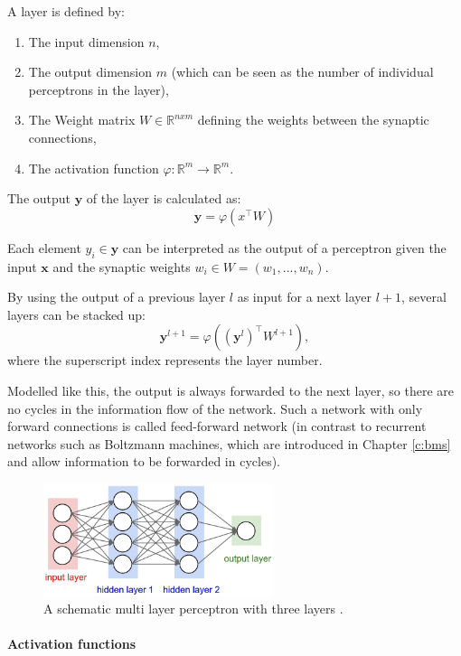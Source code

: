 A layer is defined by:
\begin{enumerate}
	\item The input dimension $n$,
	\item The output dimension $m$ (which can be seen as the number of individual perceptrons in the layer),
	\item The Weight matrix $W \in \mathbb{R}^{nxm} $ defining the weights between the synaptic connections,
	\item The activation function $\varphi : \mathbb{R}^m \rightarrow \mathbb{R}^m $.
\end{enumerate}

The output $\textbf{y}$ of the layer is calculated as:
\[
\textbf{y} = \varphi(x^\intercal W)
\]

Each element $y_i \in \textbf{y}$ can be interpreted as the output of a perceptron given the input $\textbf{x}$ and the synaptic weights $w_i \in W = (w_1, ... , w_n)$.

By using the output of a previous layer $l$ as input for a next layer $l+1$, several layers can be stacked up: 
\[
\textbf{y}^{l+1} = \varphi ((\textbf{y}^{l})^\intercal W^{l+1} ) ,
\]
where the superscript index represents the layer number. 

Modelled like this, the output is always forwarded to the next layer, so there are no cycles in the information flow of the network.
Such a network with only forward connections is called feed-forward network (in contrast to recurrent networks such as Boltzmann machines, which are introduced in Chapter \ref{c:bms} and allow information to be forwarded in cycles).

\begin{figure}
	\centering
    	\includegraphics[width=0.6\textwidth]{imgs/mlp.jpeg} 
    \caption{A schematic multi layer perceptron with three layers \cite{mlpImg}.}
	\label{fig:mlp}
\end{figure}



\paragraph{Activation functions} \label{c:mlpact}

